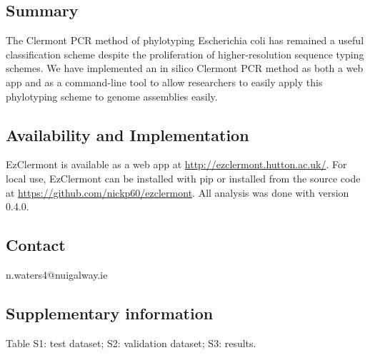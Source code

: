 
\subsection*{Summary}
The Clermont PCR method of phylotyping Escherichia coli has remained a useful classification scheme despite the proliferation of higher-resolution sequence typing schemes.  We have implemented an in silico Clermont PCR method as both a web app and as a command-line tool to allow researchers to easily apply this phylotyping scheme to genome assemblies easily.
\subsection*{Availability and Implementation}
EzClermont is available as a web app at  \url{http://ezclermont.hutton.ac.uk/}.  For local use, EzClermont can be installed with pip or installed from the source code at \url{https://github.com/nickp60/ezclermont}. All analysis was done with version 0.4.0.
\subsection*{Contact}
n.waters4@nuigalway.ie
\subsection*{Supplementary information}
Table S1: test dataset; S2: validation dataset; S3: results.
